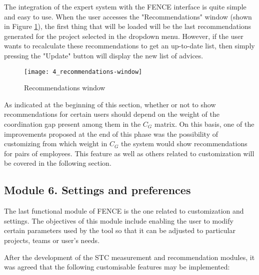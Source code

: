 The integration of the expert system with the FENCE interface is quite simple and easy to use. When the user accesses the "Recommendations" window (shown in Figure \ref{fig:recommendations}), the first thing that will be loaded will be the last recommendations generated for the project selected in the dropdown menu. However, if the user wants to recalculate these recommendations to get an up-to-date list, then simply pressing the "Update" button will display the new list of advices.

	\begin{figure}
		\centering
		\texttt{[image: 4\_recommendations-window]}
		\caption[Recommendations window]{Recommendations window}
		\label{fig:recommendations}
	\end{figure}

As indicated at the beginning of this section, whether or not to show recommendations for certain users should depend on the weight of the coordination gap present among them in the $C_G$ matrix. On this basis, one of the improvements proposed at the end of this phase was the possibility of customizing from which weight in $C_G$ the system would show recommendations for pairs of employees. This feature as well as others related to customization will be covered in the following section.

\subsection{Module 6. Settings and preferences}

The last functional module of FENCE is the one related to customization and settings. The objectives of this module include enabling the user to modify certain parameters used by the tool so that it can be adjusted to particular projects, teams or user’s needs.

After the development of the STC measurement and recommendation modules, it was agreed that the following customisable features may be implemented:

